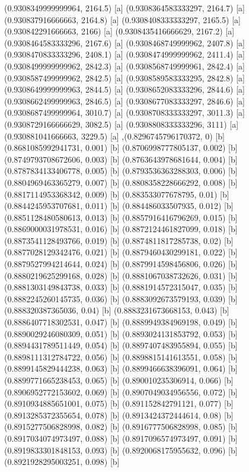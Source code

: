 {{{(0.9308349999999964, 2164.5) [a] 
(0.9308364583333297, 2164.7) [a] 
(0.930837916666663, 2164.8) [a] 
(0.9308408333333297, 2165.5) [a] 
(0.930842291666663, 2166) [a] 
(0.9308435416666629, 2167.2) [a] 
(0.9308464583333296, 2167.6) [a] 
(0.9308468749999962, 2407.8) [a] 
(0.9308470833333296, 2408.1) [a] 
(0.9308474999999962, 2411.4) [a] 
(0.9308499999999962, 2842.3) [a] 
(0.9308568749999961, 2842.4) [a] 
(0.9308587499999962, 2842.5) [a] 
(0.9308589583333295, 2842.8) [a] 
(0.9308649999999963, 2844.5) [a] 
(0.9308652083333296, 2844.6) [a] 
(0.9308662499999963, 2846.5) [a] 
(0.9308677083333297, 2846.6) [a] 
(0.9308687499999964, 3010.7) [a] 
(0.9308708333333297, 3011.3) [a] 
(0.9308729166666629, 3082.5) [a] 
(0.9308808333333296, 3111) [a] 
(0.930881041666663, 3229.5) [a] 
},{(0.8296745796170372, 0) [b] 
(0.8681085992941731, 0.001) [b] 
(0.8706998777805137, 0.002) [b] 
(0.8749793708672606, 0.003) [b] 
(0.8763643978681644, 0.004) [b] 
(0.8787834133406778, 0.005) [b] 
(0.8793536363288303, 0.006) [b] 
(0.8804969463365279, 0.007) [b] 
(0.8808358228666292, 0.008) [b] 
(0.8817114953368342, 0.009) [b] 
(0.883533077678795, 0.01) [b] 
(0.8844245953707681, 0.011) [b] 
(0.884486033507935, 0.012) [b] 
(0.8851128480580613, 0.013) [b] 
(0.8857916416796269, 0.015) [b] 
(0.8869000031978531, 0.016) [b] 
(0.8872124461827099, 0.018) [b] 
(0.8873541128493766, 0.019) [b] 
(0.8874811817285738, 0.02) [b] 
(0.8877028129342476, 0.021) [b] 
(0.8879460430299181, 0.022) [b] 
(0.8879527994214644, 0.024) [b] 
(0.8879914598456806, 0.026) [b] 
(0.8880219625299168, 0.028) [b] 
(0.8881067038732626, 0.031) [b] 
(0.8881303149843738, 0.033) [b] 
(0.8881914572315047, 0.035) [b] 
(0.8882245260145735, 0.036) [b] 
(0.8883092673579193, 0.039) [b] 
(0.888320387365036, 0.04) [b] 
(0.8883231673668153, 0.043) [b] 
(0.8886407718302531, 0.047) [b] 
(0.8889949384969198, 0.049) [b] 
(0.8890029246080309, 0.051) [b] 
(0.8893024131853792, 0.053) [b] 
(0.8894431789511449, 0.054) [b] 
(0.8897407483955894, 0.055) [b] 
(0.8898111312784722, 0.056) [b] 
(0.8898815141613551, 0.058) [b] 
(0.8899145829444238, 0.063) [b] 
(0.8899466638396091, 0.064) [b] 
(0.8899771665238453, 0.065) [b] 
(0.890010235306914, 0.066) [b] 
(0.8906952772153602, 0.069) [b] 
(0.8907049034956556, 0.072) [b] 
(0.8910934885651001, 0.075) [b] 
(0.891152842791121, 0.077) [b] 
(0.8913285372355654, 0.078) [b] 
(0.8913424372444614, 0.08) [b] 
(0.8915277506828998, 0.082) [b] 
(0.8916777506828998, 0.085) [b] 
(0.8917034074973497, 0.088) [b] 
(0.8917096574973497, 0.091) [b] 
(0.8919833301848153, 0.093) [b] 
(0.8920068175955632, 0.096) [b] 
(0.8921928295003251, 0.098) [b] 
}}}
